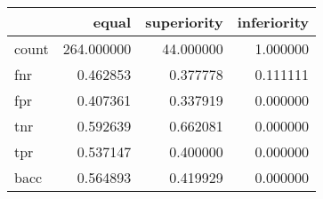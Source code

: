 \begin{tabular}{lrrr}
\toprule
{} &       equal &  superiority &  inferiority \\
\midrule
count &  264.000000 &    44.000000 &     1.000000 \\
fnr   &    0.462853 &     0.377778 &     0.111111 \\
fpr   &    0.407361 &     0.337919 &     0.000000 \\
tnr   &    0.592639 &     0.662081 &     0.000000 \\
tpr   &    0.537147 &     0.400000 &     0.000000 \\
bacc  &    0.564893 &     0.419929 &     0.000000 \\
\bottomrule
\end{tabular}
